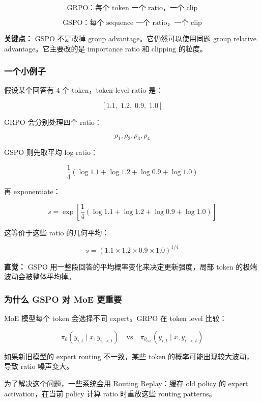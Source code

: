 \[
\text{GRPO：每个 token 一个 ratio，一个 clip}
\]

\[
\text{GSPO：每个 sequence 一个 ratio，一个 clip}
\]

\begin{warnbox}
\textbf{关键点：} GSPO 不是改掉 group advantage。它仍然可以使用同题 group relative advantage。它主要改的是 importance ratio 和 clipping 的粒度。
\end{warnbox}

\subsubsection{一个小例子}

假设某个回答有 $4$ 个 token，token-level ratio 是：

\[
[1.1,\;1.2,\;0.9,\;1.0]
\]

GRPO 会分别处理四个 ratio：

\[
\rho_{1},\rho_{2},\rho_{3},\rho_{4}
\]

GSPO 则先取平均 log-ratio：

\[
\frac{1}{4}
\left(
\log 1.1
+
\log 1.2
+
\log 0.9
+
\log 1.0
\right)
\]

再 exponentiate：

\[
s
=
\exp
\left[
\frac{1}{4}
(\log 1.1+\log 1.2+\log 0.9+\log 1.0)
\right]
\]

这等价于这些 ratio 的几何平均：

\[
s
=
(1.1 \times 1.2 \times 0.9 \times 1.0)^{1/4}
\]

\begin{intubox}
\textbf{直觉：} GSPO 用一整段回答的平均概率变化来决定更新强度，局部 token 的极端波动会被整体平均掉。
\end{intubox}

\subsubsection{为什么 GSPO 对 MoE 更重要}

MoE 模型每个 token 会选择不同 expert。GRPO 在 token level 比较：

\[
\pi_\theta(y_{i,t}\mid x,y_{i,<t})
\quad
\text{vs}
\quad
\pi_{\theta_\text{old}}(y_{i,t}\mid x,y_{i,<t})
\]

如果新旧模型的 expert routing 不一致，某些 token 的概率可能出现较大波动，导致 ratio 噪声变大。

为了解决这个问题，一些系统会用 Routing Replay：缓存 old policy 的 expert activation，在当前 policy 计算 ratio 时重放这些 routing patterns。


